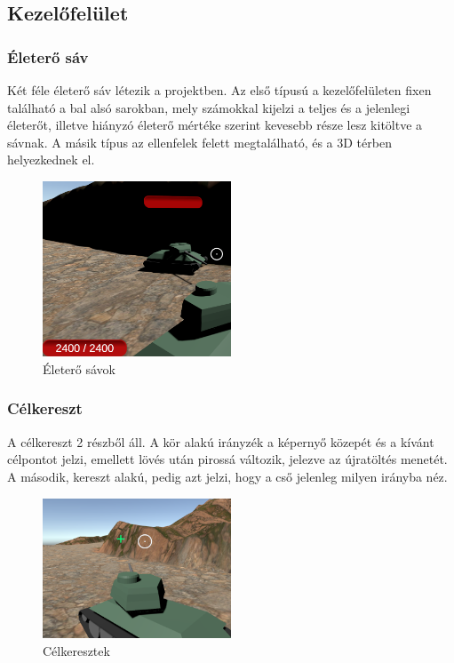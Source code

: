 \documentclass[
]{thesis-ekf}
\theoremstyle{definition}
\theoremstyle{remark}
\begin{document}
\subsection{Kezelőfelület}

\subsubsection{Életerő sáv}

Két féle életerő sáv létezik a projektben. Az első típusú a kezelőfelületen fixen található a bal alsó sarokban, mely számokkal kijelzi a teljes és a jelenlegi életerőt, illetve hiányzó életerő mértéke szerint kevesebb része lesz kitöltve a sávnak. A másik típus az ellenfelek felett megtalálható, és a 3D térben helyezkednek el.
\begin{figure}[H]
    \centering
    \includegraphics[width=0.5\textwidth]{screenshots/hpbar.png}
    \caption{Életerő sávok}
    \label{fig:healthbar}
\end{figure}


\subsubsection{Célkereszt}

A célkereszt 2 részből áll. A kör alakú irányzék a képernyő közepét és a kívánt célpontot jelzi, emellett lövés után pirossá változik, jelezve az újratöltés menetét. A második, kereszt alakú, pedig azt jelzi, hogy a cső jelenleg milyen irányba néz.

\begin{figure}[H]
    \centering
    \includegraphics[width=0.5\textwidth]{screenshots/crosshair.png}
    \caption{Célkeresztek}
    \label{fig:crosshair}
\end{figure}
\end{document}

